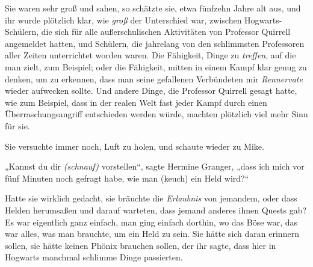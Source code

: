 Sie waren sehr groß und sahen, so schätzte sie, etwa fünfzehn Jahre alt aus, und ihr wurde plötzlich klar, wie \emph{groß} der Unterschied war, zwischen Hogwarts-Schülern, die sich für alle außerschulischen Aktivitäten von Professor Quirrell angemeldet hatten, und Schülern, die jahrelang von den schlimmsten Professoren aller Zeiten unterrichtet worden waren. Die Fähigkeit, Dinge zu \emph{treffen}, auf die man zielt, zum Beispiel; oder die Fähigkeit, mitten in einem Kampf klar genug zu denken, um zu erkennen, dass man seine gefallenen Verbündeten mir \emph{Rennervate} wieder aufwecken sollte. Und andere Dinge, die Professor Quirrell gesagt hatte, wie zum Beispiel, dass in der realen Welt fast jeder Kampf durch einen Überraschungsangriff entschieden werden würde, machten plötzlich viel mehr Sinn für sie.

Sie versuchte immer noch, Luft zu holen, und schaute wieder zu Mike.

„Kannst du dir \emph{(schnauf)} vorstellen“, sagte Hermine Granger, „dass ich mich vor fünf Minuten noch gefragt habe, wie man (keuch) ein Held wird?“

Hatte sie wirklich gedacht, sie bräuchte die \emph{Erlaubnis} von jemandem, oder dass Helden herumsaßen und darauf warteten, dass jemand anderes ihnen Quests gab? Es war eigentlich ganz einfach, man ging einfach dorthin, wo das Böse war, das war alles, was man brauchte, um ein Held zu sein. Sie hätte sich daran erinnern sollen, sie hätte keinen Phönix brauchen sollen, der ihr sagte, dass hier in Hogwarts manchmal schlimme Dinge passierten.

